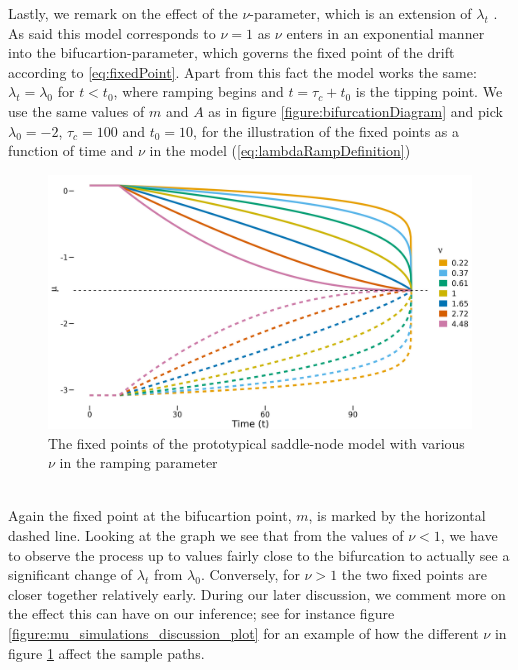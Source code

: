 Lastly, we remark on the effect of the $\nu$-parameter, which is an extension of $\lambda_t$ \cite[equation (2)]{Ditlevsen2023}. As said this model corresponds to $\nu = 1$ as $\nu$ enters in an exponential manner into the bifucartion-parameter, which governs the fixed point of the drift according to \ref{eq:fixedPoint}. Apart from this fact the model works the same: $\lambda_t = \lambda_0$ for $t<t_0$, where ramping begins and $t=\tau_c + t_0$ is the tipping point. We use the same values of $m$ and $A$ as in figure \ref{figure:bifurcationDiagram} and pick $\lambda_0 = -2$, $\tau_c = 100$ and $t_0 = 10$, for the illustration of the fixed points as a function of time and $\nu$ in the model (\ref{eq:lambdaRampDefinition})
\begin{figure}[h!]
    \begin{center}
        \includegraphics[scale = .1]{figures/nu_plot.jpeg}
        \caption{The fixed points of the prototypical saddle-node model with various $\nu$ in the ramping parameter}
        \label{figure:nu_plot}    
    \end{center}
\end{figure}\\
Again the fixed point at the bifucartion point, $m$, is marked by the horizontal dashed line. Looking at the graph we see that from the values of $\nu < 1$, we have to observe the process up to values fairly close to the bifurcation to actually see a significant change of $\lambda_t$ from $\lambda_0$. Conversely, for $\nu>1$ the two fixed points are closer together relatively early. During our later discussion, we comment more on the effect this can have on our inference; see for instance figure \ref{figure:mu_simulations_discussion_plot} for an example of how the different $\nu$ in figure \ref{figure:nu_plot} affect the sample paths. 


